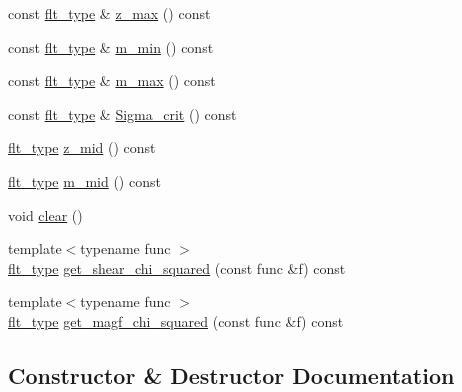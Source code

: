 \begin{DoxyCompactItemize}
\item 
const \hyperlink{lib_2IceBRG__main_2common_8h_ad0f130a56eeb944d9ef2692ee881ecc4}{flt\+\_\+type} \& \hyperlink{classlensing__fitting__bin_a6c564531cd0aa131b2e94216f9080b5b}{z\+\_\+max} () const 
\item 
const \hyperlink{lib_2IceBRG__main_2common_8h_ad0f130a56eeb944d9ef2692ee881ecc4}{flt\+\_\+type} \& \hyperlink{classlensing__fitting__bin_aad144b49db0b2b526de25177a1ab6278}{m\+\_\+min} () const 
\item 
const \hyperlink{lib_2IceBRG__main_2common_8h_ad0f130a56eeb944d9ef2692ee881ecc4}{flt\+\_\+type} \& \hyperlink{classlensing__fitting__bin_ad6a14402fa01167833af2aef5245a6c9}{m\+\_\+max} () const 
\item 
const \hyperlink{lib_2IceBRG__main_2common_8h_ad0f130a56eeb944d9ef2692ee881ecc4}{flt\+\_\+type} \& \hyperlink{classlensing__fitting__bin_aa1f8c8200ee999b406eb8c50734f7c16}{Sigma\+\_\+crit} () const 
\item 
\hyperlink{lib_2IceBRG__main_2common_8h_ad0f130a56eeb944d9ef2692ee881ecc4}{flt\+\_\+type} \hyperlink{classlensing__fitting__bin_a258e95543205304a21d50d711f4dafaf}{z\+\_\+mid} () const 
\item 
\hyperlink{lib_2IceBRG__main_2common_8h_ad0f130a56eeb944d9ef2692ee881ecc4}{flt\+\_\+type} \hyperlink{classlensing__fitting__bin_a1c95ea71a49ed1337fc7c032e851bd2d}{m\+\_\+mid} () const 
\item 
void \hyperlink{classlensing__fitting__bin_a68886acb64ab7612cbc22b8a79f17cf0}{clear} ()
\item 
{\footnotesize template$<$typename func $>$ }\\\hyperlink{lib_2IceBRG__main_2common_8h_ad0f130a56eeb944d9ef2692ee881ecc4}{flt\+\_\+type} \hyperlink{classlensing__fitting__bin_a6bc4ded478442146200420a9ac70c0db}{get\+\_\+shear\+\_\+chi\+\_\+squared} (const func \&f) const 
\item 
{\footnotesize template$<$typename func $>$ }\\\hyperlink{lib_2IceBRG__main_2common_8h_ad0f130a56eeb944d9ef2692ee881ecc4}{flt\+\_\+type} \hyperlink{classlensing__fitting__bin_ad185a642437c2104c4c5af328e33feaf}{get\+\_\+magf\+\_\+chi\+\_\+squared} (const func \&f) const 
\end{DoxyCompactItemize}


\subsection{Constructor \& Destructor Documentation}
\hypertarget{classlensing__fitting__bin_a07c2e5fbe3b49afcd5942e5eb77b9b0c}{}
